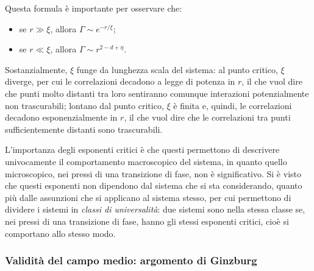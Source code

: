 \documentclass[11pt, a4paper]{scrartcl}
\theoremstyle{style}
\theoremstyle{style1}
\numberwithin{equation}{subsection}
\begin{document}
Questa formula \`e importante per osservare che:
\begin{itemize}
	\item se $r\gg \xi $, allora $\Gamma \sim e^{-r / \xi }$;
	\item se $r \ll \xi $, allora $\Gamma \sim r^{2 - d + \eta}$.
\end{itemize}
Sostanzialmente, $\xi $ funge da lunghezza scala del sistema: al punto critico, $\xi $ diverge, per cui le correlazioni decadono a legge di potenza in $r$, il che vuol dire che punti molto distanti tra loro sentiranno comunque interazioni potenzialmente non trascurabili; lontano dal punto critico, $\xi $ \`e finita e, quindi, le correlazioni decadono esponenzialmente in $r$, il che vuol dire che le correlazioni tra punti sufficientemente distanti sono trascurabili.

L'importanza degli esponenti critici \`e che questi permettono di descrivere univocamente il comportamento macroscopico del sistema, in quanto quello microscopico, nei pressi di una transizione di fase, non \`e significativo.
Si \`e visto che questi esponenti non dipendono dal sistema che si sta considerando, quanto pi\`u dalle assunzioni che si applicano al sistema stesso, per cui permettono di dividere i sistemi in \textit{classi di universalit\`a}: due sistemi sono nella stessa classe se, nei pressi di una transizione di fase, hanno gli stessi esponenti critici, cio\`e si comportano allo stesso modo.
\subsubsection{Validit\`a del campo medio: argomento di Ginzburg}
\end{document}
